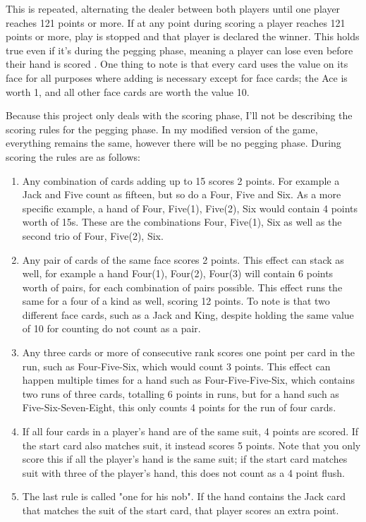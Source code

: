 \documentclass[]{article}
\begin{document}
This is repeated, alternating the dealer between both players until one player reaches 121 points or more. If at any point during scoring a player reaches 121 points or more, play is stopped and that player is declared the winner. This holds true even if it's during the pegging phase, meaning a player can lose even before their hand is scored \cite{cribbage_rules}\cite{cribbage_rules_montana}. One thing to note is that every card uses the value on its face for all purposes where adding is necessary except for face cards; the Ace is worth 1, and all other face cards are worth the value 10. 

Because this project only deals with the scoring phase, I'll not be describing the scoring rules for the pegging phase. In my modified version of the game, everything remains the same, however there will be no pegging phase. During scoring the rules are as follows: 

\begin{enumerate}
    \item Any combination of cards adding up to 15 scores 2 points. For example a Jack and Five count as fifteen, but so do a Four, Five and Six. As a more specific example, a hand of Four, Five(1), Five(2), Six would contain 4 points worth of 15s. These are the combinations Four, Five(1), Six as well as the second trio of Four, Five(2), Six. 
    \item Any pair of cards of the same face scores 2 points. This effect can stack as well, for example a hand Four(1), Four(2), Four(3) will contain 6 points worth of pairs, for each combination of pairs possible. This effect runs the same for a four of a kind as well, scoring 12 points. To note is that two different face cards, such as a Jack and King, despite holding the same value of 10 for counting do not count as a pair. 
    \item Any three cards or more of consecutive rank scores one point per card in the run, such as Four-Five-Six, which would count 3 points. This effect can happen multiple times for a hand such as Four-Five-Five-Six, which contains two runs of three cards, totalling 6 points in runs, but for a hand such as Five-Six-Seven-Eight, this only counts 4 points for the run of four cards. 
    \item If all four cards in a player's hand are of the same suit, 4 points are scored. If the start card also matches suit, it instead scores 5 points. Note that you only score this if all the player's hand is the same suit; if the start card matches suit with three of the player's hand, this does not count as a 4 point flush.
    \item The last rule is called "one for his nob". If the hand contains the Jack card that matches the suit of the start card, that player scores an extra point. 
\end{enumerate}
\end{document}
